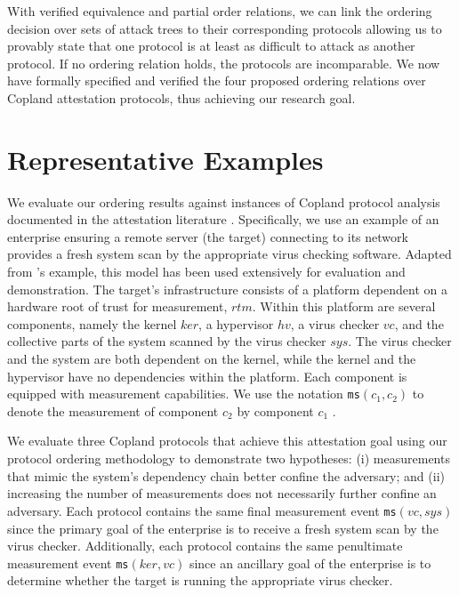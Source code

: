 \documentclass[runningheads]{llncs}
\theoremstyle{definition}
\begin{document}
With verified equivalence and partial order relations, we can link the
ordering decision over sets of attack trees to their corresponding
protocols allowing us to provably state that one protocol is at least
as difficult to attack as another protocol. If no ordering relation
holds, the protocols are incomparable. We now have formally specified
and verified the four proposed ordering relations over Copland
attestation protocols, thus achieving our research goal.

\section{Representative Examples}

We evaluate our ordering results against instances of Copland protocol
analysis documented in the attestation literature
\citep{Rowe:2021:OnOrdering,Coker::Principles-of-R}. Specifically, we
use an example of an enterprise ensuring a remote server (the target)
connecting to its network provides a fresh system scan by the
appropriate virus checking software. Adapted from
\citeauthor{Rowe:2021:OnOrdering}'s \citep{Rowe:2016:Confining}
example, this model has been used extensively for evaluation and
demonstration.  The target's infrastructure consists of a platform
dependent on a hardware root of trust for measurement, $rtm$. Within
this platform are several components, namely the kernel $ker$, a
hypervisor $hv$, a virus checker $vc$, and the collective parts of the
system scanned by the virus checker $sys$. The virus checker and the
system are both dependent on the kernel, while the kernel and the
hypervisor have no dependencies within the platform. Each component is
equipped with measurement capabilities. We use the notation
\texttt{ms}$(c_1,c_2)$ to denote the measurement of component $c_2$ by
component $c_1$ .

We evaluate three Copland protocols that achieve this attestation goal
using our protocol ordering methodology to demonstrate two hypotheses:
(i) measurements that mimic the system's dependency chain better
confine the adversary; and (ii) increasing the number of measurements
does not necessarily further confine an adversary. Each protocol
contains the same final measurement event \texttt{ms}$(vc,sys)$ since
the primary goal of the enterprise is to receive a fresh system scan
by the virus checker. Additionally, each protocol contains the same
penultimate measurement event \texttt{ms}$(ker,vc)$ since an ancillary
goal of the enterprise is to determine whether the target is running
the appropriate virus checker.
\end{document}
